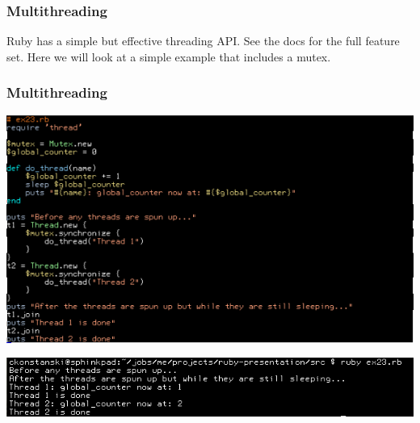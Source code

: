 \documentclass[helvetica,english,utf8,notitle,nologo]{beamer}
\begin{document}
\begin{frame}
  \frametitle{Multithreading}

  Ruby has a simple but effective threading API. See the docs for the
  full feature set. Here we will look at a simple example that
  includes a mutex.
\end{frame}

\begin{frame}
  \frametitle{Multithreading}

  \includegraphics[scale=0.53]{src_23}

  \includegraphics[scale=0.5]{out_23}
\end{frame}
\end{document}
